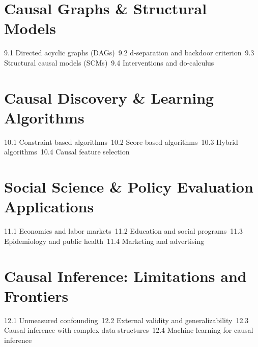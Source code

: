 \section{Causal Graphs \& Structural Models}
9.1 Directed acyclic graphs (DAGs)\
9.2 d-separation and backdoor criterion\
9.3 Structural causal models (SCMs)\
9.4 Interventions and do-calculus\
\section{Causal Discovery \& Learning Algorithms}
10.1 Constraint-based algorithms\
10.2 Score-based algorithms\
10.3 Hybrid algorithms\
10.4 Causal feature selection\
\section{Social Science \& Policy Evaluation Applications}
11.1 Economics and labor markets\
11.2 Education and social programs\
11.3 Epidemiology and public health\
11.4 Marketing and advertising\
\section{Causal Inference: Limitations and Frontiers}
12.1 Unmeasured confounding\
12.2 External validity and generalizability\
12.3 Causal inference with complex data structures\
12.4 Machine learning for causal inference\
